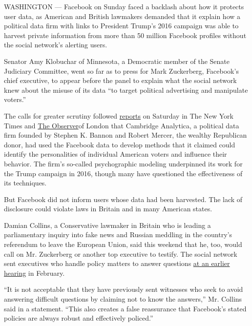 WASHINGTON --- Facebook on Sunday faced a backlash about how it protects
user data, as American and British lawmakers demanded that it explain
how a political data firm with links to President Trump's 2016 campaign
was able to harvest private information from more than 50 million
Facebook profiles without the social network's alerting users.

Senator Amy Klobuchar of Minnesota, a Democratic member of the Senate
Judiciary Committee, went so far as to press for Mark Zuckerberg,
Facebook's chief executive, to appear before the panel to explain what
the social network knew about the misuse of its data ``to target
political advertising and manipulate voters.''

The calls for greater scrutiny followed
\href{https://www.nytimes3xbfgragh.onion/2018/03/17/us/politics/cambridge-analytica-trump-campaign.html?hp\&action=click\&pgtype=Homepage\&clickSource=story-heading\&module=first-column-region\&region=top-news\&WT.nav=top-news}{reports}
on Saturday in The New York Times and
\href{https://www.theguardian.com/news/2018/mar/17/cambridge-analytica-facebook-influence-us-election}{The
Observer}of London that Cambridge Analytica, a political data firm
founded by Stephen K. Bannon and Robert Mercer, the wealthy Republican
donor, had used the Facebook data to develop methods that it claimed
could identify the personalities of individual American voters and
influence their behavior. The firm's so-called psychographic modeling
underpinned its work for the Trump campaign in 2016, though many have
questioned the effectiveness of its techniques.

But Facebook did not inform users whose data had been harvested. The
lack of disclosure could violate laws in Britain and in many American
states.

Damian Collins, a Conservative lawmaker in Britain who is leading a
parliamentary inquiry into fake news and Russian meddling in the
country's referendum to leave the European Union, said this weekend that
he, too, would call on Mr. Zuckerberg or another top executive to
testify. The social network sent executives who handle policy matters to
answer questions
\href{http://data.parliament.uk/writtenevidence/committeeevidence.svc/evidencedocument/digital-culture-media-and-sport-committee/fake-news/oral/78195.html}{at
an earlier hearing} in February.

``It is not acceptable that they have previously sent witnesses who seek
to avoid answering difficult questions by claiming not to know the
answers,'' Mr. Collins said in a statement. ``This also creates a false
reassurance that Facebook's stated policies are always robust and
effectively policed.''

